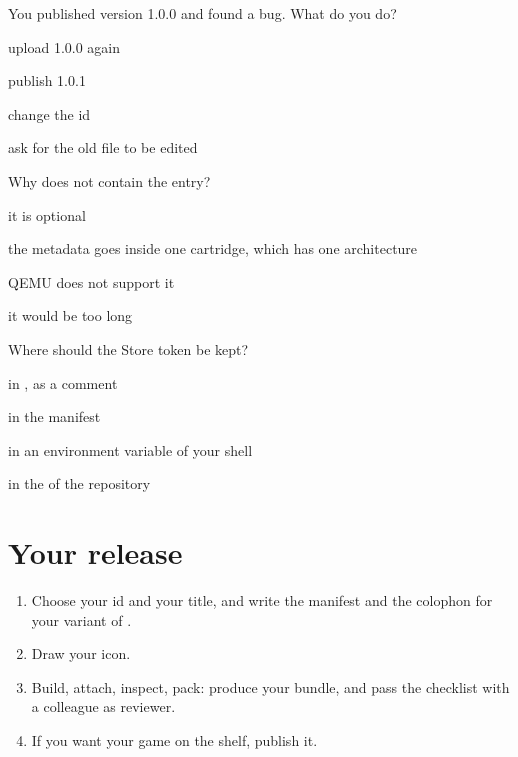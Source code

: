 \begin{quiz}{You published version 1.0.0 and found a bug. What do you do?}
\item upload 1.0.0 again
\item publish 1.0.1
\item change the id
\item ask for the old file to be edited
\end{quiz}

\begin{quiz}{Why does  not contain the  entry?}
\item it is optional
\item the metadata goes inside one cartridge, which has one architecture
\item QEMU does not support it
\item it would be too long
\end{quiz}

\begin{quiz}{Where should the Store token be kept?}
\item in , as a comment
\item in the manifest
\item in an environment variable of your shell
\item in the  of the repository
\end{quiz}

\section{Your release}

\begin{exercise}
\begin{enumerate}[nosep]
\item Choose your id and your title, and write the manifest and the colophon
  for your variant of \vermone.
\item Draw your icon.
\item Build, attach, inspect, pack: produce your bundle, and pass the
  checklist with a colleague as reviewer.
\item If you want your game on the shelf, publish it.
\end{enumerate}
\end{exercise}


